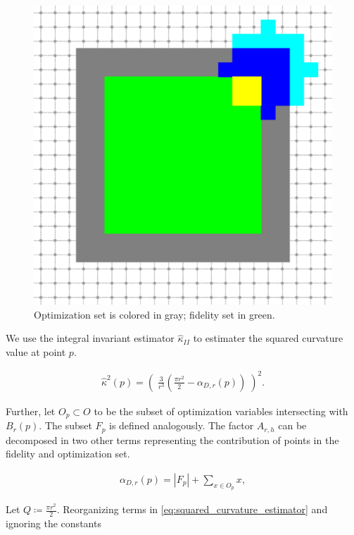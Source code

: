 \documentclass[runningheads]{llncs}
\begin{document}
	\begin{figure}[!ht]
		\center
		\includegraphics[scale=0.25]{images/qbo_regions.eps}
		\caption{Optimization set is colored in gray; fidelity set in green.}
	\end{figure}
	
	We use the integral invariant estimator $\hat{\kappa}_{II}$ to estimater the squared curvature value at point $p$.
	
	\begin{align}
		\hat{\kappa}^2(p) = \left( \; \frac{3}{r^3}\left( \frac{\pi r^2}{2} - \alpha_{D,r}(p) \right) \; \right)^2.
		\label{eq:squared_curvature_estimator}
	\end{align}
	
	Further, let $O_{p} \subset O$ to be the subset of optimization variables intersecting with $B_r(p)$. The subset $F_p$ is defined analogously. The factor $A_{r,h}$ can be decomposed in two other terms representing the contribution of points in the fidelity and optimization set.
	
	\begin{align*}
		\alpha_{D,r}(p) = |F_{p}| + \sum_{x \in O_p}{x},
	\end{align*}
	
	Let $Q \coloneqq \frac{\pi r^2}{2}$. Reorganizing terms in \eqref{eq:squared_curvature_estimator} and ignoring the constants 
	
\end{document}
